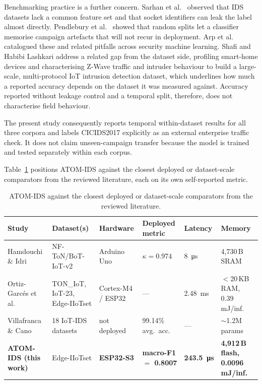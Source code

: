 \documentclass[10pt,letterpaper,twocolumn]{article}
\begin{document}
Benchmarking practice is a further concern. Sarhan et al.\
\cite{sarhan2022standard} observed that IDS datasets lack a common feature set
and that socket identifiers can leak the label almost directly. Pendlebury et
al.\ \cite{pendlebury2019tesseract} showed that random splits let a classifier
memorise campaign artefacts that will not recur in deployment. Arp et al.\
\cite{arp2022dos} catalogued these and related pitfalls across security machine
learning. Shafi and Habibi Lashkari \cite{shafi2025iotzwave} address a related
gap from the dataset side, profiling smart-home devices and characterising
Z-Wave traffic and intruder behaviour to build a large-scale, multi-protocol
IoT intrusion detection dataset, which underlines how much a reported
accuracy depends on the dataset it was measured against. Accuracy reported
without leakage control and a temporal split, therefore, does not characterise
field behaviour.

The present study consequently reports temporal within-dataset results for all
three corpora and labels CICIDS2017 explicitly as an external enterprise
traffic check. It does not claim unseen-campaign transfer because the model is
trained and tested separately within each corpus.


Table~\ref{tab:related-compare} positions ATOM-IDS against the closest
deployed or dataset-scale comparators from the reviewed literature, each on its
own self-reported metric. 

\begin{table}[!ht]
\centering
\caption{ATOM-IDS against the closest deployed or dataset-scale comparators
from the reviewed literature.}
\label{tab:related-compare}
\footnotesize\setlength{\tabcolsep}{3pt}
\renewcommand{\arraystretch}{1.15}
\begin{tabular}{@{}p{2.0cm}p{2.4cm}p{1.6cm}p{2.0cm}p{1.55cm}p{1.95cm}@{}}
\toprule
Study & Dataset(s) & Hardware & Deployed metric & Latency & Memory \\
\midrule
Hamdouchi \& Idri \cite{hamdouchi2025tinyml} &
  NF-ToN/BoT-IoT-v2 & Arduino Uno &
  $\kappa = 0.974$ & \SI{8}{\micro\second} & 4,730\,B SRAM \\
Ortiz-Garc\'{e}s et al.\ \cite{ortizgarces2026nas} &
  TON\_IoT, IoT-23, Edge-IIoTset & Cortex-M4 / ESP32 &
  --- & \SI{2.48}{\milli\second} & $<$20\,KB RAM, 0.39\,mJ/inf. \\
Villafranca \& Cano \cite{villafranca2025edgedl} &
  18 IoT-IDS datasets & not deployed &
  99.14\% avg.\ acc.\ & --- & $\sim$1.2M params \\
\textbf{ATOM-IDS (this work)} &
  Edge-IIoTset & \textbf{ESP32-S3} &
  \textbf{macro-F1 $=$ 0.8007} & \textbf{\SI{243.5}{\micro\second}} &
  \textbf{4,912\,B flash, 0.0096 mJ/inf.} \\
\bottomrule
\end{tabular}
\end{table}
\end{document}
